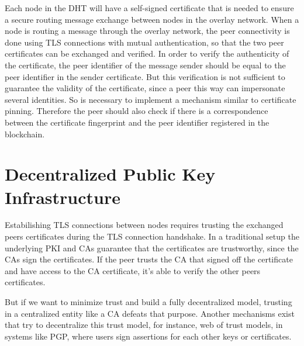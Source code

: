 Each node in the DHT will have a self-signed certificate that is needed to ensure a secure routing message exchange between nodes in the overlay network.
When a node is routing a message through the overlay network, the peer connectivity is done using TLS connections with mutual authentication, so that the two peer certificates can be exchanged and verified.
In order to verify the authenticity of the certificate, the peer identifier of the message sender should be equal to the peer identifier in the sender certificate.
But this verification is not sufficient to guarantee the validity of the certificate, since a peer this way can impersonate several identities.
So is necessary to implement a mechanism similar to certificate pinning.
Therefore the peer should also check if there is a correspondence between the certificate fingerprint and the peer identifier registered in the blockchain.




\section{Decentralized Public Key Infrastructure} \label{ssec:blockchain}

Estabilishing \ac{TLS} connections between nodes requires trusting the exchanged peers certificates during the \ac{TLS} connection handshake.
In a traditional setup the underlying \ac{PKI} and \acp{CA} guarantee that the certificates are trustworthy, since the \acp{CA} sign the certificates.
If the peer trusts the \ac{CA} that signed off the certificate and have access to the \ac{CA} certificate, it's able to verify the other peers certificates.

But if we want to minimize trust and build a fully decentralized model, trusting in a centralized entity like a \ac{CA} defeats that purpose.
Another mechanisms exist that try to decentralize this trust model, for instance, web of trust models, in systems like \ac{PGP}, where users sign assertions for each other keys or certificates.

